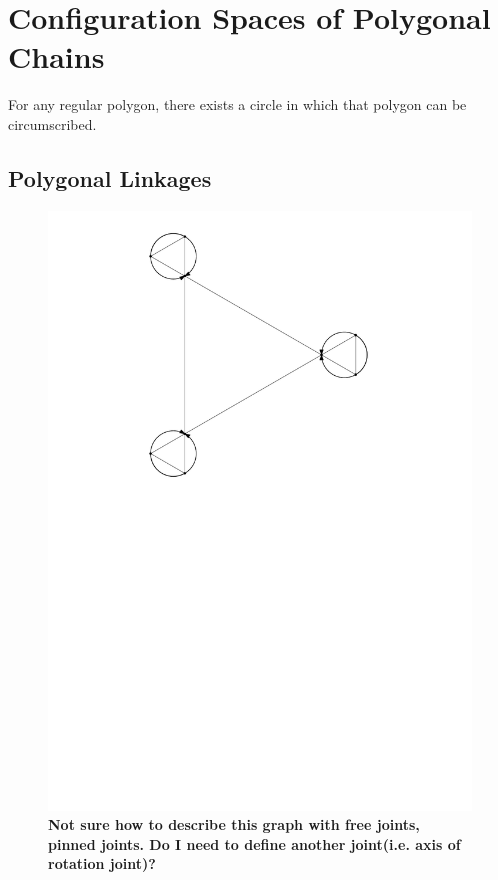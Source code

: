 \section{Configuration Spaces of Polygonal Chains}
For any regular polygon, there exists a circle in which that polygon can be circumscribed.
\subsection{Polygonal Linkages}
\begin{figure}[!ht]
\begin{center}
\includegraphics[scale=.5]{graphics/PolygonalLinkageWithConfigurationSpace.pdf}
\end{center} 
\caption{\textbf{Not sure how to describe this graph with free joints, pinned joints.  Do I need to define another joint(i.e. axis of rotation joint)?}}
\end{figure}
